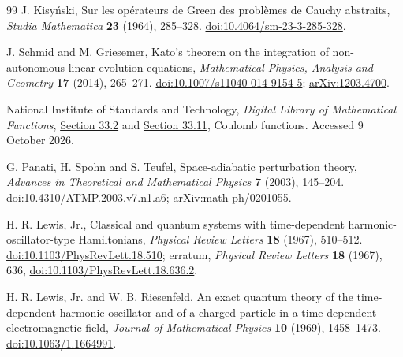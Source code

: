 \documentclass[11pt]{article}
\numberwithin{equation}{section}
\theoremstyle{definition}
\theoremstyle{remark}
\begin{document}
\begin{thebibliography}{99}
J. Kisy\'nski, Sur les op\'erateurs de Green des probl\`emes de Cauchy abstraits,
\emph{Studia Mathematica} \textbf{23} (1964), 285--328.
\href{https://doi.org/10.4064/sm-23-3-285-328}{doi:10.4064/sm-23-3-285-328}.

J. Schmid and M. Griesemer, Kato's theorem on the integration of non-autonomous linear evolution equations,
\emph{Mathematical Physics, Analysis and Geometry} \textbf{17} (2014), 265--271.
\href{https://doi.org/10.1007/s11040-014-9154-5}{doi:10.1007/s11040-014-9154-5};
\href{https://arxiv.org/abs/1203.4700}{arXiv:1203.4700}.

National Institute of Standards and Technology, \emph{Digital Library of Mathematical Functions},
\href{https://dlmf.nist.gov/33.2}{Section 33.2} and
\href{https://dlmf.nist.gov/33.11}{Section 33.11}, Coulomb functions.
Accessed 9 October 2026.

G. Panati, H. Spohn and S. Teufel, Space-adiabatic perturbation theory,
\emph{Advances in Theoretical and Mathematical Physics} \textbf{7} (2003), 145--204.
\href{https://doi.org/10.4310/ATMP.2003.v7.n1.a6}{doi:10.4310/ATMP.2003.v7.n1.a6};
\href{https://arxiv.org/abs/math-ph/0201055}{arXiv:math-ph/0201055}.

H. R. Lewis, Jr., Classical and quantum systems with time-dependent harmonic-oscillator-type Hamiltonians,
\emph{Physical Review Letters} \textbf{18} (1967), 510--512.
\href{https://doi.org/10.1103/PhysRevLett.18.510}{doi:10.1103/PhysRevLett.18.510};
erratum, \emph{Physical Review Letters} \textbf{18} (1967), 636,
\href{https://doi.org/10.1103/PhysRevLett.18.636.2}{doi:10.1103/PhysRevLett.18.636.2}.

H. R. Lewis, Jr. and W. B. Riesenfeld, An exact quantum theory of the time-dependent harmonic oscillator
and of a charged particle in a time-dependent electromagnetic field,
\emph{Journal of Mathematical Physics} \textbf{10} (1969), 1458--1473.
\href{https://doi.org/10.1063/1.1664991}{doi:10.1063/1.1664991}.
\end{thebibliography}
\end{document}
